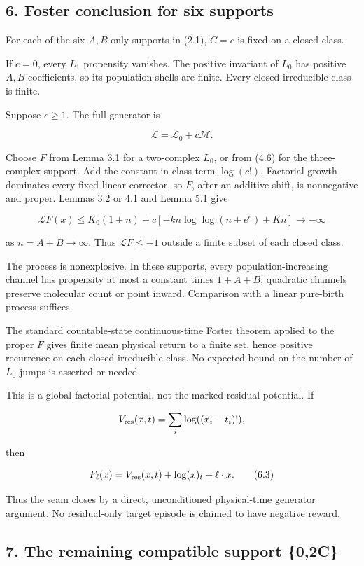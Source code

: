 \subsection{6. Foster conclusion for six
supports}

For each of the six \(A,B\)-only supports in (2.1), \(C=c\) is fixed on
a closed class.

If \(c=0\), every \(L_1\) propensity vanishes. The positive invariant of
\(L_0\) has positive \(A,B\) coefficients, so its population shells are
finite. Every closed irreducible class is finite.

Suppose \(c\ge1\). The full generator is

\[
 \mathcal L=\mathcal L_0+c\mathcal M.
\tag{6.1}
\]

Choose \(F\) from Lemma 3.1 for a two-complex \(L_0\), or from (4.6) for
the three-complex support. Add the constant-in-class term \(\log(c!)\).
Factorial growth dominates every fixed linear corrector, so \(F\), after
an additive shift, is nonnegative and proper. Lemmas 3.2 or 4.1 and
Lemma 5.1 give

\[
 \mathcal LF(x)
 \le K_0(1+n)+c[-kn\log\log(n+e^e)+Kn]
 \longrightarrow-\infty
\tag{6.2}
\]

as \(n=A+B\to\infty\). Thus \(\mathcal LF\le-1\) outside a finite subset
of each closed class.

The process is nonexplosive. In these supports, every
population-increasing channel has propensity at most a constant times
\(1+A+B\); quadratic channels preserve molecular count or point inward.
Comparison with a linear pure-birth process suffices.

The standard countable-state continuous-time Foster theorem applied to
the proper \(F\) gives finite mean physical return to a finite set,
hence positive recurrence on each closed irreducible class. No expected
bound on the number of \(L_0\) jumps is asserted or needed.

This is a global factorial potential, not the marked residual potential.
If

\[
 V_{\rm res}(x,t)=\sum_i\log((x_i-t_i)!),
\]

then

\[
 F_\ell(x)=V_{\rm res}(x,t)+\log(x)_t+\ell\cdot x.
\tag{6.3}
\]

Thus the seam closes by a direct, unconditioned physical-time generator
argument. No residual-only target episode is claimed to have negative
reward.

\subsection{7. The remaining compatible support
\{0,2C\}}

